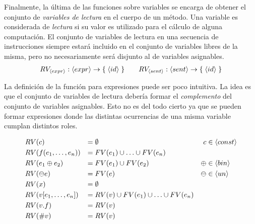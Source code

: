 \documentclass{article}
\begin{document}
Finalmente, la última de las funciones sobre variables se encarga de obtener el conjunto de \textit{variables de lectura} en el cuerpo de un método.
Una variable es considerada de \textit{lectura} si su valor es utilizado para el cálculo de alguna computación.
El conjunto de variables de lectura en una secuencia de instrucciones siempre estará incluido en el conjunto de variables libres de la misma, pero no necesariamente será disjunto al de variables asignables.
\begin{gather*}
RV_{\langle expr \rangle}: \langle expr \rangle \rightarrow \{ \; \langle id \rangle \; \}
\qquad
RV_{\langle sent \rangle}: \langle sent \rangle \rightarrow \{ \; \langle id \rangle \; \}
\end{gather*}

La definición de la función para expresiones puede ser poco intuitiva.
La idea es que el conjunto de variables de lectura debería formar el \textit{complemento} del conjunto de variables asignables.
Esto no es del todo cierto ya que se pueden formar expresiones donde las distintas ocurrencias de una misma variable cumplan distintos roles.


\begin{align*}
&RV(c)
&=&\;
\emptyset
&c &\in \langle const \rangle
\\
&RV(f(e_1, \ldots, e_n))
&=&\;
FV(e_1) \cup \ldots \cup FV(e_n)
\\
&RV(e_1 \oplus e_2)
&=&\;
FV(e_1) \cup FV(e_2)
&\oplus &\in \langle bin \rangle
\\
&RV(\ominus e)
&=&\;
FV(e)
&\ominus &\in \langle un \rangle
\\
&RV(x)
&=&\;
\emptyset
\\
&RV(v [e_1, \ldots, e_n])
&=&\;
RV(v) \cup FV(e_1) \cup \ldots \cup FV(e_n)
\\
&RV(v.f)
&=&\;
RV(v)
\\
&RV(\# v)
&=&\;
RV(v)
\end{align*}
\end{document}

